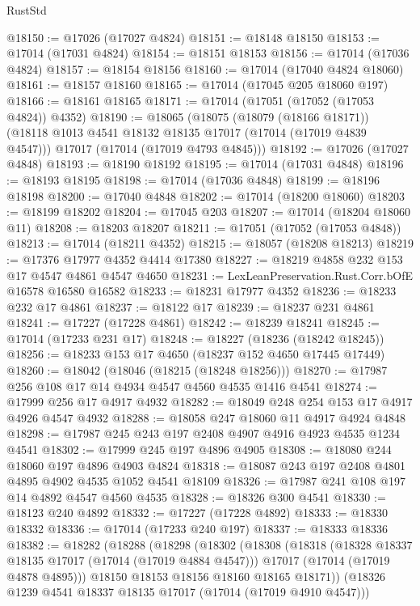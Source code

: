 \begin{lexlean}{RustStd}
\begin{coremodule}
{\begin{coremodule}
{{{{{{{{{{{{{{{{{{{{{{{{{{{{{{{{{{{{{{{{{{{{{{{{{{{{{{{@18150 := @17026 (@17027 @4824)
@18151 := @18148 @18150
@18153 := @17014 (@17031 @4824)
@18154 := @18151 @18153
@18156 := @17014 (@17036 @4824)
@18157 := @18154 @18156
@18160 := @17014 (@17040 @4824 @18060)
@18161 := @18157 @18160
@18165 := @17014 (@17045 @205 @18060 @197)
@18166 := @18161 @18165
@18171 := @17014 (@17051 (@17052 (@17053 @4824)) @4352)
@18190 := @18065
    (@18075
      (@18079 (@18166 @18171))
      (@18118 @1013 @4541 @18132 @18135 @17017 (@17014 (@17019 @4839 @4547)))
      @17017
      (@17014 (@17019 @4793 @4845)))
@18192 := @17026 (@17027 @4848)
@18193 := @18190 @18192
@18195 := @17014 (@17031 @4848)
@18196 := @18193 @18195
@18198 := @17014 (@17036 @4848)
@18199 := @18196 @18198
@18200 := @17040 @4848
@18202 := @17014 (@18200 @18060)
@18203 := @18199 @18202
@18204 := @17045 @203
@18207 := @17014 (@18204 @18060 @11)
@18208 := @18203 @18207
@18211 := @17051 (@17052 (@17053 @4848))
@18213 := @17014 (@18211 @4352)
@18215 := @18057 (@18208 @18213)
@18219 := @17376 @17977 @4352 @4414 @17380
@18227 := @18219 @4858 @232 @153 @17 @4547 @4861 @4547 @4650
@18231 := LexLeanPreservation.Rust.Corr.bOfE @16578 @16580 @16582
@18233 := @18231 @17977 @4352
@18236 := @18233 @232 @17 @4861
@18237 := @18122 @17
@18239 := @18237 @231 @4861
@18241 := @17227 (@17228 @4861)
@18242 := @18239 @18241
@18245 := @17014 (@17233 @231 @17)
@18248 := @18227 (@18236 (@18242 @18245))
@18256 := @18233 @153 @17 @4650 (@18237 @152 @4650 @17445 @17449)
@18260 := @18042 (@18046 (@18215 (@18248 @18256)))
@18270 := @17987 @256 @108 @17 @14 @4934 @4547 @4560 @4535 @1416 @4541
@18274 := @17999 @256 @17 @4917 @4932
@18282 := @18049 @248 @254 @153 @17 @4917 @4926 @4547 @4932
@18288 := @18058 @247 @18060 @11 @4917 @4924 @4848
@18298 := @17987 @245 @243 @197 @2408 @4907 @4916 @4923 @4535 @1234 @4541
@18302 := @17999 @245 @197 @4896 @4905
@18308 := @18080 @244 @18060 @197 @4896 @4903 @4824
@18318 := @18087 @243 @197 @2408 @4801 @4895 @4902 @4535 @1052 @4541 @18109
@18326 := @17987 @241 @108 @197 @14 @4892 @4547 @4560 @4535
@18328 := @18326 @300 @4541
@18330 := @18123 @240 @4892
@18332 := @17227 (@17228 @4892)
@18333 := @18330 @18332
@18336 := @17014 (@17233 @240 @197)
@18337 := @18333 @18336
@18382 := @18282
    (@18288
      (@18298
        (@18302
          (@18308
            (@18318
              (@18328 @18337 @18135 @17017 (@17014 (@17019 @4884 @4547)))
              @17017
              (@17014 (@17019 @4878 @4895)))
            @18150
            @18153
            @18156
            @18160
            @18165
            @18171))
        (@18326 @1239 @4541 @18337 @18135 @17017 (@17014 (@17019 @4910 @4547)))
}}}}}}}}}}}}}}}}}}}}}}}}}}}}}}}}}}}}}}}}}}}}}}}}}}}}}}}
\end{coremodule}}
\end{coremodule}
\end{lexlean}

